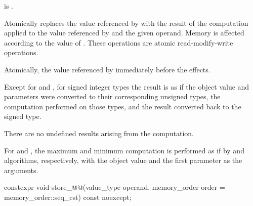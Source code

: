\begin{itemdescr}
\pnum
\constraints
{} is .

\pnum
\effects
Atomically replaces the value referenced by  with
the result of the computation applied to the value referenced by 
and the given operand.
Memory is affected according to the value of .
These operations are atomic read-modify-write operations.

\pnum
\returns
Atomically, the value referenced by 
immediately before the effects.

\pnum
{}%
\remarks
Except for  and , for signed integer types
the result is as if the object value and parameters
were converted to their corresponding unsigned types,
the computation performed on those types, and
the result converted back to the signed type.
\begin{note}
There are no undefined results arising from the computation.
\end{note}

\pnum
For  and , the maximum and minimum
computation is performed as if by  and 
algorithms, respectively,
with the object value and the first parameter as the arguments.
\end{itemdescr}

%
%
%
%
%
%
\begin{itemdecl}
constexpr void store_@@(value_type operand,
                         memory_order order = memory_order::seq_cst) const noexcept;
\end{itemdecl}

